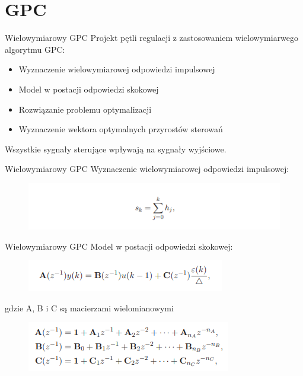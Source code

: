 \section{GPC}
\begin{frame}{Wielowymiarowy GPC}
Projekt pętli regulacji z zastosowaniem wielowymiarwego algorytmu GPC:
\begin{itemize}
    \item Wyznaczenie wielowymiarowej odpowiedzi impulsowej
    \item Model w postacji odpowiedzi skokowej
    \item Rozwiązanie problemu optymalizacji
    \item Wyznaczenie wektora optymalnych przyrostów sterowań
\end{itemize}
Wszystkie sygnały sterujące wpływają na sygnały wyjściowe. 
\end{frame}

\begin{frame}{Wielowymiarowy GPC}
Wyznaczenie wielowymiarowej odpowiedzi impulsowej:
	\begin{center}
		\begin{figure}[H]
            		\includegraphics[scale=0.7]{images/odp_GPC.png}
		\end{figure}
	\end{center}
\end{frame}

\begin{frame}{Wielowymiarowy GPC}
Model w postacji odpowiedzi skokowej:
	\begin{center}
		\begin{figure}[H]
            		\includegraphics[scale=0.7]{images/model_GPC.png}
		\end{figure}
	\end{center}
gdzie A, B i C są macierzami wielomianowymi
\begin{center}
		\begin{figure}[H]
            		\includegraphics[scale=0.7]{images/macierze_GPC.png}
		\end{figure}
	\end{center}
\end{frame}

